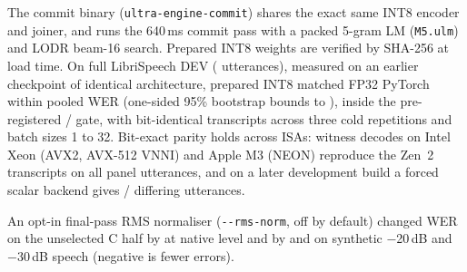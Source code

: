  The commit binary
(\texttt{ultra-engine-commit}) shares the exact same INT8 encoder and joiner, and runs the 640\,ms
commit pass with a packed 5-gram LM (\texttt{M5.ulm}) and LODR beam-16 search. Prepared INT8 weights
are verified by SHA-256 at load time. On full LibriSpeech DEV (\RelFullUtts{} utterances), measured
on an earlier checkpoint of identical architecture, prepared INT8 matched FP32 PyTorch within
\RelIntEightDelta\pp pooled WER (one-sided 95\% bootstrap bounds \RelIntEightLo{} to
\RelIntEightHi\pp), inside the pre-registered \PreregDeltaPP\pp / \PreregUpperPP\pp gate, with
bit-identical transcripts across three cold repetitions and batch sizes 1 to 32. Bit-exact parity
holds across ISAs: \CandIsaRuns{} witness decodes on Intel Xeon (AVX2, AVX-512 VNNI) and Apple M3
(NEON) reproduce the Zen~2 transcripts on all \ScalarUtts{} panel utterances, and
on a later development build a forced scalar backend gives \ScalarDiffs/\ScalarUtts{} differing utterances.

 An opt-in final-pass RMS normaliser (\texttt{-{}-rms-norm}, off by
default) changed WER on the unselected C half by \AudioZOneCleanDelta\pp at native level and by
\AudioZOneTwentyDelta\pp and \AudioZOneThirtyDelta\pp on synthetic $-$20\,dB and $-$30\,dB speech
(negative is fewer errors).
